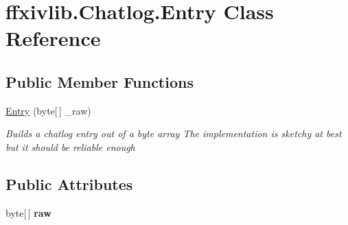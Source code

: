 \hypertarget{classffxivlib_1_1_chatlog_1_1_entry}{\section{ffxivlib.\-Chatlog.\-Entry Class Reference}
\label{classffxivlib_1_1_chatlog_1_1_entry}
}
\subsection*{Public Member Functions}
\begin{DoxyCompactItemize}
\item 
\hyperlink{classffxivlib_1_1_chatlog_1_1_entry_a39ea4531858e358a3849a74a20eeb5f7}{Entry} (byte\mbox{[}$\,$\mbox{]} \-\_\-raw)
\begin{DoxyCompactList}\small\item\em Builds a chatlog entry out of a byte array The implementation is sketchy at best but it should be reliable enough \end{DoxyCompactList}\end{DoxyCompactItemize}
\subsection*{Public Attributes}
\begin{DoxyCompactItemize}
\item 
\hypertarget{classffxivlib_1_1_chatlog_1_1_entry_a433a573640f940b69cfe60b4e3742daf}{byte\mbox{[}$\,$\mbox{]} {\bfseries raw}}\label{classffxivlib_1_1_chatlog_1_1_entry_a433a573640f940b69cfe60b4e3742daf}

\end{DoxyCompactItemize}
